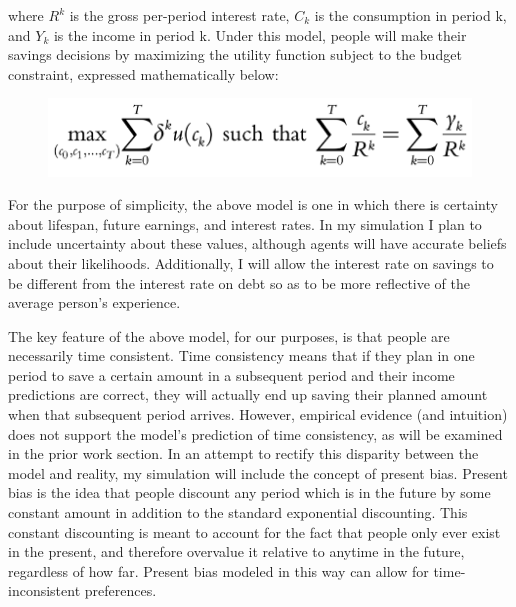 \documentclass[10pt,twocolumn]{article}
\begin{document}
\noindent where $R^k$ is the gross per-period interest rate, $C_k$ is the consumption in period k, and $Y_k$ is the income in period k. Under this model, people will make their savings decisions by maximizing the utility function subject to the budget constraint, expressed mathematically below:
\begin{figure}[h]
    \centering
    \includegraphics[width=1\linewidth]{underinvestment3.png}
\end{figure}

For the purpose of simplicity, the above model is one in which there is certainty about lifespan, future earnings, and interest rates. In my simulation I plan to include uncertainty about these values, although agents will have accurate beliefs about their likelihoods. Additionally, I will allow the interest rate on savings to be different from the interest rate on debt so as to be more reflective of the average person's experience. 

The key feature of the above model, for our purposes, is that people are necessarily time consistent. Time consistency means that if they plan in one period to save a certain amount in a subsequent period and their income predictions are correct, they will actually end up saving their planned amount when that subsequent period arrives. However, empirical evidence (and intuition) does not support the model’s prediction of time consistency, as will be examined in the prior work section. In an attempt to rectify this disparity between the model and reality, my simulation will include the concept of present bias. Present bias is the idea that people discount any period which is in the future by some constant amount in addition to the standard exponential discounting. This constant discounting is meant to account for the fact that people only ever exist in the present, and therefore overvalue it relative to anytime in the future, regardless of how far. Present bias modeled in this way can allow for time-inconsistent preferences.  
\end{document}
